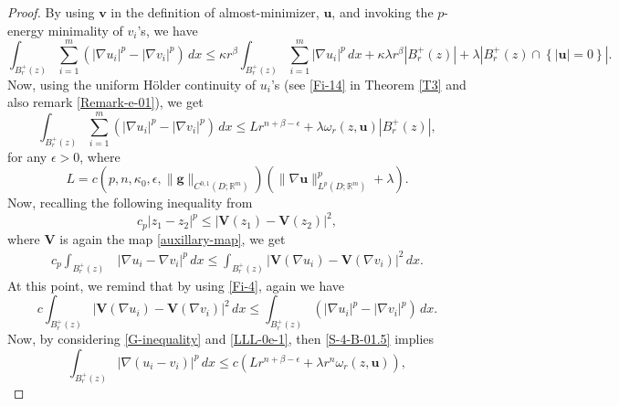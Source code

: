 \documentclass{amsart}
\begin{document}
\begin{proof}
By using $\mathbf{v}$ in the definition of almost-minimizer, $\mathbf{u}$, and invoking the $p$-energy minimality of $v_i$'s, we have
$$ \int_{B_r^+(z)} \sum_{i=1}^{m} \left(|\nabla u_i|^p - |\nabla v_i|^p \right) \, dx \leq \kappa r^{\beta} \int_{B_r^+(z)} \sum_{i=1}^{m} |\nabla u_i|^p \, dx + \kappa \lambda r^{\beta} |B_r^+(z)| + \lambda \left| B_r^+(z) \cap \left\{ |\mathbf{u}|=0 \right\}  \right|. $$
Now, using the uniform H\"older continuity of $u_i$'s (see \eqref{Fi-14} in Theorem \ref{T3} and also remark \ref{Remark-e-01}), we get
\begin{equation}
\label{S-4-B-01.5}
\int_{B_r^+(z)} \sum_{i=1}^{m} \left(|\nabla u_i|^p - |\nabla v_i|^p \right) \, dx \leq L r^{n+\beta-\epsilon}  + \lambda \omega_r(z, \mathbf{u})  \left| B_r^+(z) \right|,
\end{equation}
for any $\epsilon>0$, where
\begin{equation}
\label{LLL-0e-00}
L=c(p, n, \kappa_0, \epsilon, \|\mathbf{g} \|_{C^{0,1}(D;\mathbb{R}^m)}) \left( \| \nabla \mathbf{u} \|^p_{L^p(D; \mathbb{R}^m)}+\lambda \right).
\end{equation} 
Now, recalling the following inequality from \cite[equation (3.13)]{de2023nonuniformly}
$$ c_p |z_1-z_2|^p \leq \left| \mathbf{V}(z_1)- \mathbf{V}(z_2) \right|^2,
$$
where $\mathbf{V}$ is again the map \eqref{auxillary-map}, 
we get
\begin{align}\label{G-inequality}
c_p \int_{B_r^+(z)} & |\nabla u_i - \nabla v_i|^p \, dx
\leq \int_{B_r^+(z)} \left| \mathbf{V}(\nabla u_i)-\mathbf{V}(\nabla v_i) \right|^2 \, dx. %
\end{align}
At this point, we remind that by using \eqref{Fi-4}, again we have 
\begin{equation}
\label{LLL-0e-1}
c \int_{B_r^+(z)} \left| \mathbf{V}(\nabla u_i)-\mathbf{V}(\nabla v_i) \right|^2 \, dx \leq \int_{B_r^+(z)} \left(\left| \nabla u_i \right|^p-\left| \nabla v_i \right|^p \right) \, dx.
\end{equation}
Now, by considering \eqref{G-inequality} and \eqref{LLL-0e-1}, then \eqref{S-4-B-01.5} implies  
\begin{equation}
\label{S-4-B-01.25}
\int_{B_{r}^+(z)} | \nabla ({u_i} - {v_i})|^p \, dx \leq c \left( L  r^{n+\beta-\epsilon} + \lambda r^n \omega_r(z, \mathbf{u}) \right),
\end{equation}

\end{proof}
\end{document}
